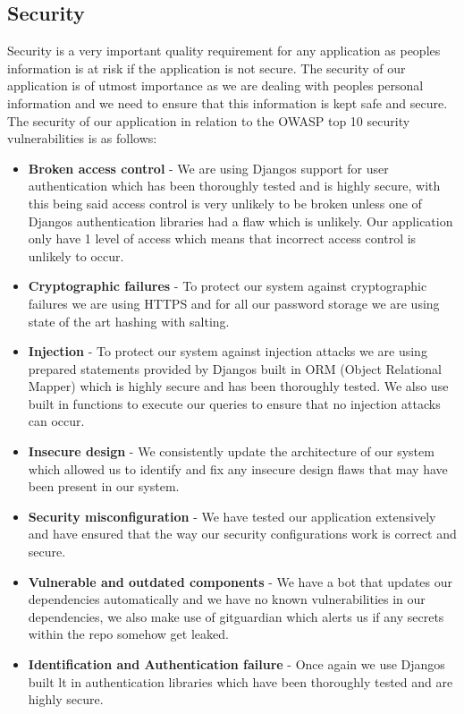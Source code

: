 \documentclass[12pt]{article}
\begin{document}
\newpage
\subsection{Security}
Security is a very important quality requirement for any application as peoples information is at risk if the application is not secure. The security of our application is of utmost importance as we are dealing with peoples personal information and we need to ensure that this information is kept safe and secure. The security of our application in relation to the OWASP top 10 security vulnerabilities is as follows:
\begin{itemize}
    \item \textbf{Broken access control} - We are using Djangos support for user authentication which has been thoroughly tested and is highly secure, with this being said access control is very unlikely to be broken unless one of Djangos authentication libraries had a flaw which is unlikely. Our application only have 1 level of access which means that incorrect access control is unlikely to occur.
    \item \textbf{Cryptographic failures} - To protect our system against cryptographic failures we are using HTTPS and for all our password storage we are using state of the art hashing with salting.
    \item \textbf{Injection} - To protect our system against injection attacks we are using prepared statements provided by Djangos built in ORM (Object Relational Mapper) which is highly secure and has been thoroughly tested. We also use built in functions to execute our queries to ensure that no injection attacks can occur.
    \item \textbf{Insecure design} - We consistently update the architecture of our system which allowed us to identify and fix any insecure design flaws that may have been present in our system.
    \item \textbf{Security misconfiguration} - We have tested our application extensively and have ensured that the way our security configurations work is correct and secure.
    \item \textbf{Vulnerable and outdated components} - We have a bot that updates our dependencies automatically and we have no known vulnerabilities in our dependencies, we also make use of gitguardian which alerts us if any secrets within the repo somehow get leaked.
    \item \textbf{Identification and Authentication failure} - Once again we use Djangos built lt in authentication libraries which have been thoroughly tested and are highly secure.

\end{itemize}
\end{document}
